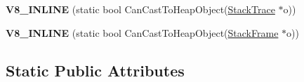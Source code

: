 \begin{DoxyCompactItemize}
\item 
\hypertarget{classv8_1_1internal_1_1_internals_ad0279acf4aa7efcc241504b960c10e12}{}{\bfseries V8\+\_\+\+I\+N\+L\+I\+N\+E} (static bool Can\+Cast\+To\+Heap\+Object(\hyperlink{classv8_1_1_stack_trace}{Stack\+Trace} $\ast$o))\label{classv8_1_1internal_1_1_internals_ad0279acf4aa7efcc241504b960c10e12}

\item 
\hypertarget{classv8_1_1internal_1_1_internals_a8ffcd387eb494753f0e0c2a526f7ca44}{}{\bfseries V8\+\_\+\+I\+N\+L\+I\+N\+E} (static bool Can\+Cast\+To\+Heap\+Object(\hyperlink{classv8_1_1_stack_frame}{Stack\+Frame} $\ast$o))\label{classv8_1_1internal_1_1_internals_a8ffcd387eb494753f0e0c2a526f7ca44}

\end{DoxyCompactItemize}
\subsection*{Static Public Attributes}
